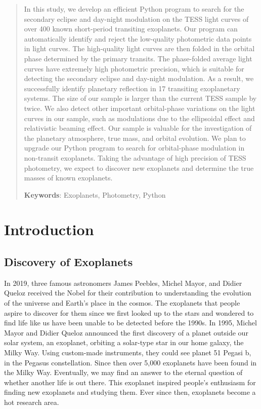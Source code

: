 \documentclass{article}
\begin{document}
\begin{abstract}
\noindent In this study, we develop an efficient Python program to search for the secondary eclipse and day-night modulation on the TESS light curves of over 400 known short-period transiting exoplanets. Our program can automatically identify and reject the low-quality photometric data points in light curves. The high-quality light curves are then folded in the orbital phase determined by the primary transits. The phase-folded average light curves have extremely high photometric precision, which is suitable for detecting the secondary eclipse and day-night modulation. As a result, we successfully identify planetary reflection in 17 transiting exoplanetary systems. The size of our sample is larger than the current TESS sample by twice. We also detect other important orbital-phase variations on the light curves in our sample, such as modulations due to the ellipsoidal effect and relativistic beaming effect. Our sample is valuable for the investigation of the planetary atmosphere, true mass, and orbital evolution. We plan to upgrade our Python program to search for orbital-phase modulation in non-transit exoplanets. Taking the advantage of high precision of TESS photometry, we expect to discover new exoplanets and determine the true masses of known exoplanets.
 \vspace{\baselineskip}

\noindent \textbf{Keywords}: Exoplanets, Photometry, Python
\end{abstract}


\newpage

\tableofcontents
\newpage

\clearpage
{} 
\section{Introduction}


\subsection{Discovery of Exoplanets}

In 2019, three famous astronomers James Peebles, Michel Mayor, and Didier Queloz received the Nobel for their contribution to understanding the evolution of the universe and Earth’s place in the cosmos. The exoplanets that people aspire to discover for them since we first looked up to the stars and wondered to find life like us have been unable to be detected before the 1990s. In 1995, Michel Mayor and Didier Queloz announced the first discovery of a planet outside our solar system, an exoplanet, orbiting a solar-type star in our home galaxy, the Milky Way. Using custom-made instruments, they could see planet 51 Pegasi b, in the Pegasus constellation. Since then over 5,000 exoplanets have been found in the Milky Way. Eventually, we may find an answer to the eternal question of whether another life is out there. This exoplanet inspired people's enthusiasm for finding new exoplanets and studying them. Ever since then, exoplanets become a hot research area.
\end{document}
